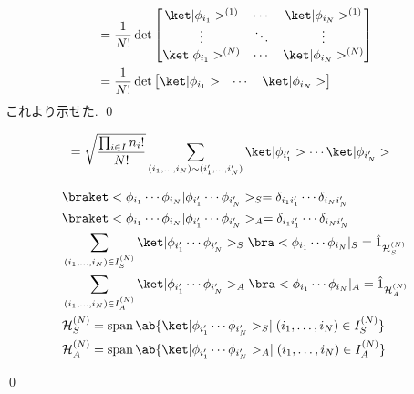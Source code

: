 \documentclass[uplatex,dvipdfmx,a4paper,11pt]{jlreq}
\makeatletter
\DeclareMathOperator{\Span}{span}
\newcommand{\HH}{\mathcal{H}}
\numberwithin{equation}{section}
\theoremstyle{definition}
\renewenvironment{proof}[1][\proofname]{\par
  \normalfont
  \topsep6\p@\@plus6\p@ \trivlist
  \item[\hskip\labelsep{\bfseries #1}\@addpunct{\bfseries}]\ignorespaces\quad\par
}{%
  \qed\endtrivlist\@endpefalse
}
\renewcommand\proofname{証明}
\makeatother
\begin{document}
\begin{proof}
\begin{align}
                                                         & = \frac{1}{N!}\det\begin{bmatrix}
                                                                               \ket|\phi_{i_1}>^{(1)} & \cdots & \ket|\phi_{i_N}>^{(1)} \\
                                                                               \vdots                 & \ddots & \vdots                 \\
                                                                               \ket|\phi_{i_1}>^{(N)} & \cdots & \ket|\phi_{i_N}>^{(N)}
                                                                             \end{bmatrix}                                      \\
                                                         & = \frac{1}{N!}\det\begin{bmatrix}
                                                                               \ket|\phi_{i_1}> & \cdots & \ket|\phi_{i_N}>
                                                                             \end{bmatrix}
  \end{align}
  これより示せた.
\end{proof}
\begin{proposition}
  \begin{align}
     & = \sqrt{\frac{\prod_{i\in I}n_i!}{N!}}\sum_{(i_1,\ldots,i_N)\sim(i_1',\ldots,i_N')}\ket|\phi_{i_1'}>\cdots\ket|\phi_{i_N'}>
  \end{align}
\end{proposition}


\begin{proposition}[Q21-20, Q21-21]
  \begin{align}
     & \braket<\phi_{i_1}\cdots\phi_{i_N}|\phi_{i_1'}\cdots\phi_{i_N'}>_S = \delta_{i_1i_1'}\cdots\delta_{i_Ni_N'}                        \\
     & \braket<\phi_{i_1}\cdots\phi_{i_N}|\phi_{i_1'}\cdots\phi_{i_N'}>_A = \delta_{i_1i_1'}\cdots\delta_{i_Ni_N'}                        \\
     & \sum_{(i_1,\ldots,i_N)\in I_S^{(N)}}\ket|\phi_{i_1'}\cdots\phi_{i_N'}>_S\bra<\phi_{i_1}\cdots\phi_{i_N}|_S = \hat{1}_{\HH_S^{(N)}} \\
     & \sum_{(i_1,\ldots,i_N)\in I_A^{(N)}}\ket|\phi_{i_1'}\cdots\phi_{i_N'}>_A\bra<\phi_{i_1}\cdots\phi_{i_N}|_A = \hat{1}_{\HH_A^{(N)}} \\
     & \HH_S^{(N)} = \Span\ab\{\ket|\phi_{i_1'}\cdots\phi_{i_N'}>_S \mid (i_1,\ldots,i_N)\in I_S^{(N)} \}                                 \\
     & \HH_A^{(N)} = \Span\ab\{\ket|\phi_{i_1'}\cdots\phi_{i_N'}>_A \mid (i_1,\ldots,i_N)\in I_A^{(N)} \}
  \end{align}
\end{proposition}
\begin{proof}
\end{proof}
\end{document}
